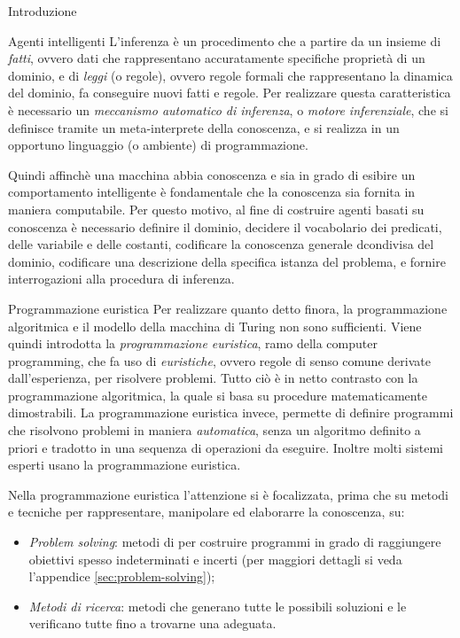 \begin{chapter}{Introduzione}
\begin{section}{Agenti intelligenti}
L'inferenza \`e un procedimento che a partire da un insieme di \textit{fatti}, ovvero dati
che rappresentano accuratamente specifiche propriet\`a di un dominio, e di \textit{leggi}
(o regole), ovvero regole formali che rappresentano la dinamica del dominio, fa conseguire
nuovi fatti e regole. Per realizzare questa caratteristica \`e necessario un
\textit{meccanismo automatico di inferenza}, o \textit{motore inferenziale}, che si
definisce tramite un meta-interprete della conoscenza, e si realizza in un opportuno linguaggio
(o ambiente) di programmazione.

Quindi affinch\`e una macchina abbia conoscenza e sia in grado di esibire un comportamento intelligente
\`e fondamentale che la conoscenza sia fornita in maniera computabile. Per questo motivo, al fine di costruire
agenti basati su conoscenza \`e necessario definire il dominio, decidere il vocabolario dei predicati, delle variabile
e delle costanti, codificare la conoscenza generale dcondivisa del dominio, codificare una descrizione della 
specifica istanza del problema, e fornire interrogazioni alla procedura di inferenza.   
\end{section}

\begin{section}{Programmazione euristica}
\label{sec:heuristic-programming}
Per realizzare quanto detto finora, la programmazione algoritmica e il modello della macchina di Turing non sono
sufficienti. Viene quindi introdotta la \textit{programmazione euristica}, ramo della computer programming, che fa
uso di \textit{euristiche}, ovvero regole di senso comune derivate dall'esperienza, per risolvere problemi. Tutto ci\`o 
\`e in netto contrasto con la programmazione algoritmica, la quale si basa su procedure matematicamente dimostrabili.
La programmazione euristica invece, permette di definire programmi che risolvono problemi in maniera \textit{automatica}, 
senza un algoritmo definito a priori e tradotto in una sequenza di operazioni da eseguire. Inoltre molti sistemi esperti usano la programmazione euristica.

Nella programmazione euristica l'attenzione si \`e focalizzata, prima che su
metodi e tecniche per rappresentare, manipolare ed elaborarre la conoscenza, su:
\begin{itemize}
	\item \textit{Problem solving}: metodi di per costruire programmi in grado di
    raggiungere obiettivi spesso indeterminati e incerti (per maggiori dettagli si
    veda l'appendice \ref{sec:problem-solving});
	\item \textit{Metodi di ricerca}: metodi che generano tutte le possibili
    soluzioni e le verificano tutte fino a trovarne una adeguata.
\end{itemize}  


\end{section}
\end{chapter}

